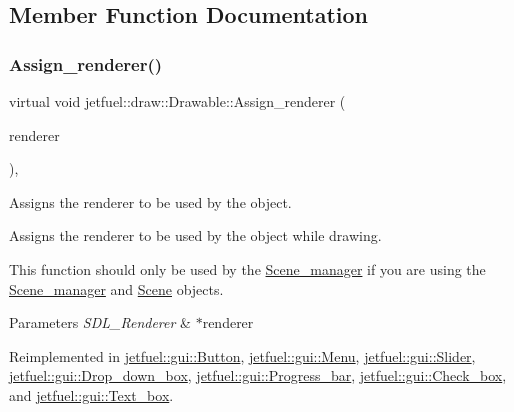 \subsection{Member Function Documentation}
\mbox{\label{classjetfuel_1_1draw_1_1Drawable_a0d7257f197d6ffcdd89c3a99c93d1400}} 
\subsubsection{\texorpdfstring{Assign\+\_\+renderer()}{Assign\_renderer()}}
{\footnotesize\ttfamily virtual void jetfuel\+::draw\+::\+Drawable\+::\+Assign\+\_\+renderer (\begin{DoxyParamCaption}\item[{S\+D\+L\+\_\+\+Renderer $\ast$}]{renderer }\end{DoxyParamCaption})\hspace{0.3cm}{\ttfamily [inline]}, {\ttfamily [virtual]}}



Assigns the renderer to be used by the object. 

Assigns the renderer to be used by the object while drawing.

This function should only be used by the \hyperlink{classjetfuel_1_1draw_1_1Scene__manager}{Scene\+\_\+manager} if you are using the \hyperlink{classjetfuel_1_1draw_1_1Scene__manager}{Scene\+\_\+manager} and \hyperlink{classjetfuel_1_1draw_1_1Scene}{Scene} objects.


\begin{DoxyParams}{Parameters}
{\em S\+D\+L\+\_\+\+Renderer} & $\ast$renderer \\
\hline
\end{DoxyParams}


Reimplemented in \hyperlink{classjetfuel_1_1gui_1_1Button_aa566a1d59623fde8d062c3d02b6fd5f4}{jetfuel\+::gui\+::\+Button}, \hyperlink{classjetfuel_1_1gui_1_1Menu_acf4a69ccd0ee1490d02fa005c8eba1b4}{jetfuel\+::gui\+::\+Menu}, \hyperlink{classjetfuel_1_1gui_1_1Slider_af9ceba04fec0f7cdc097ea0513094176}{jetfuel\+::gui\+::\+Slider}, \hyperlink{classjetfuel_1_1gui_1_1Drop__down__box_a9160249744bdd278e20a77f470421d3e}{jetfuel\+::gui\+::\+Drop\+\_\+down\+\_\+box}, \hyperlink{classjetfuel_1_1gui_1_1Progress__bar_a34797d42cedf5ff096eafb58c2e76128}{jetfuel\+::gui\+::\+Progress\+\_\+bar}, \hyperlink{classjetfuel_1_1gui_1_1Check__box_a544261fc2f2d182b73c7ea629fa35e78}{jetfuel\+::gui\+::\+Check\+\_\+box}, and \hyperlink{classjetfuel_1_1gui_1_1Text__box_ad387deeeb41a04ab4fc34a48ba5ed910}{jetfuel\+::gui\+::\+Text\+\_\+box}.

